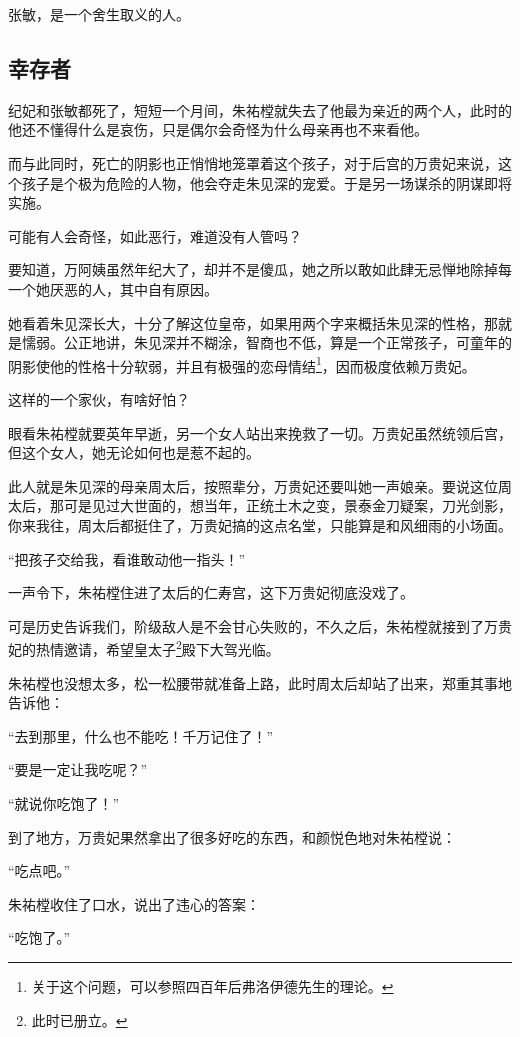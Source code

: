 \begin{multicols}{\theparacolNo}
		张敏，是一个舍生取义的人。

		\subsection{幸存者}
		纪妃和张敏都死了，短短一个月间，朱祐樘就失去了他最为亲近的两个人，此时的他还不懂得什么是哀伤，只是偶尔会奇怪为什么母亲再也不来看他。

		而与此同时，死亡的阴影也正悄悄地笼罩着这个孩子，对于后宫的万贵妃来说，这个孩子是个极为危险的人物，他会夺走朱见深的宠爱。于是另一场谋杀的阴谋即将实施。

		可能有人会奇怪，如此恶行，难道没有人管吗？

		要知道，万阿姨虽然年纪大了，却并不是傻瓜，她之所以敢如此肆无忌惮地除掉每一个她厌恶的人，其中自有原因。

		她看着朱见深长大，十分了解这位皇帝，如果用两个字来概括朱见深的性格，那就是懦弱。公正地讲，朱见深并不糊涂，智商也不低，算是一个正常孩子，可童年的阴影使他的性格十分软弱，并且有极强的恋母情结\footnote{关于这个问题，可以参照四百年后弗洛伊德先生的理论。}，因而极度依赖万贵妃。

		这样的一个家伙，有啥好怕？

		眼看朱祐樘就要英年早逝，另一个女人站出来挽救了一切。万贵妃虽然统领后宫，但这个女人，她无论如何也是惹不起的。

		此人就是朱见深的母亲周太后，按照辈分，万贵妃还要叫她一声娘亲。要说这位周太后，那可是见过大世面的，想当年，正统土木之变，景泰金刀疑案，刀光剑影，你来我往，周太后都挺住了，万贵妃搞的这点名堂，只能算是和风细雨的小场面。

		“把孩子交给我，看谁敢动他一指头！”

		一声令下，朱祐樘住进了太后的仁寿宫，这下万贵妃彻底没戏了。

		可是历史告诉我们，阶级敌人是不会甘心失败的，不久之后，朱祐樘就接到了万贵妃的热情邀请，希望皇太子\footnote{此时已册立。}殿下大驾光临。

		朱祐樘也没想太多，松一松腰带就准备上路，此时周太后却站了出来，郑重其事地告诉他：

		“去到那里，什么也不能吃！千万记住了！”

		“要是一定让我吃呢？”

		“就说你吃饱了！”

		到了地方，万贵妃果然拿出了很多好吃的东西，和颜悦色地对朱祐樘说：

		“吃点吧。”

		朱祐樘收住了口水，说出了违心的答案：

		“吃饱了。”


\end{multicols}
